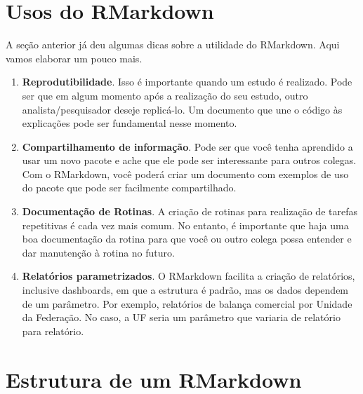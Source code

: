 \documentclass[]{book}
\begin{document}
\section{Usos do RMarkdown}\label{usos-do-rmarkdown}

A seção anterior já deu algumas dicas sobre a utilidade do RMarkdown.
Aqui vamos elaborar um pouco mais.

\begin{enumerate}
\def\labelenumi{\arabic{enumi}.}
\item
  \textbf{Reprodutibilidade}. Isso é importante quando um estudo é
  realizado. Pode ser que em algum momento após a realização do seu
  estudo, outro analista/pesquisador deseje replicá-lo. Um documento que
  une o código às explicações pode ser fundamental nesse momento.
\item
  \textbf{Compartilhamento de informação}. Pode ser que você tenha
  aprendido a usar um novo pacote e ache que ele pode ser interessante
  para outros colegas. Com o RMarkdown, você poderá criar um documento
  com exemplos de uso do pacote que pode ser facilmente compartilhado.
\item
  \textbf{Documentação de Rotinas}. A criação de rotinas para realização
  de tarefas repetitivas é cada vez mais comum. No entanto, é importante
  que haja uma boa documentação da rotina para que você ou outro colega
  possa entender e dar manutenção à rotina no futuro.
\item
  \textbf{Relatórios parametrizados}. O RMarkdown facilita a criação de
  relatórios, inclusive dashboards, em que a estrutura é padrão, mas os
  dados dependem de um parâmetro. Por exemplo, relatórios de balança
  comercial por Unidade da Federação. No caso, a UF seria um parâmetro
  que variaria de relatório para relatório.
\end{enumerate}

\section{Estrutura de um RMarkdown}\label{estrutura-de-um-rmarkdown}
\end{document}
